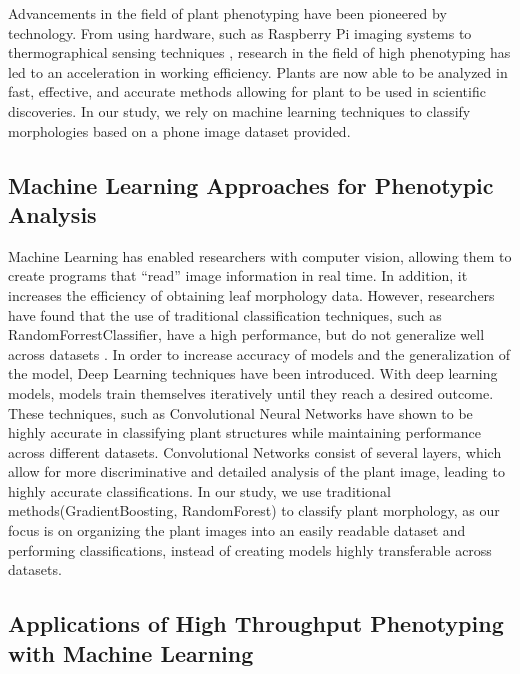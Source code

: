 \documentclass[final,5p,times,twocolumn,authoryear]{elsarticle}
\begin{document}
Advancements in the field of plant phenotyping have been pioneered by technology. 
From using hardware, such as Raspberry Pi imaging systems \citep{tausen2020greenotyper} to thermographical sensing techniques \citep{walter2015plant}, research in the field of high phenotyping has led to an acceleration in working efficiency. Plants are now able to be analyzed in fast, effective, and accurate methods allowing for plant to be used in scientific discoveries. In our study, we rely on machine learning techniques to classify morphologies based on a phone image dataset provided.

\subsection{Machine Learning Approaches for Phenotypic Analysis}
\label{related_works_2}

Machine Learning has enabled researchers with computer vision, allowing them to create programs that “read” image information in real time. In addition, it increases the efficiency of obtaining leaf morphology data. However, researchers have found that the use of traditional classification techniques, such as RandomForrestClassifier, have a high performance, but do not generalize well across datasets \citep{pound2017deep}. In order to increase accuracy of models and the generalization of the model, Deep Learning techniques have been introduced. With deep learning models, models train themselves iteratively until they reach a desired outcome. These techniques, such as Convolutional Neural Networks \citep{koh2021automated, pound2017deep} have shown to be highly accurate in classifying plant structures while maintaining performance across different datasets. Convolutional Networks consist of several layers, which allow for more discriminative and detailed analysis of the plant image, leading to highly accurate classifications. In our study, we use traditional methods(GradientBoosting, RandomForest) to classify plant morphology, as our focus is on organizing the plant images into an easily readable dataset and performing classifications, instead of creating models highly transferable across datasets.

\subsection{Applications of High Throughput Phenotyping with Machine Learning}
\label{related_works_3}
\end{document}
